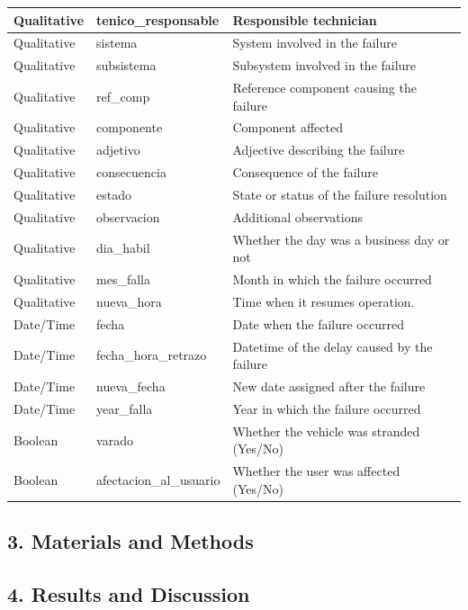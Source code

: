 \documentclass[
  letterpaper,
  DIV=11,
  numbers=noendperiod]{scrartcl}
\begin{document}
\begin{table}[H]
\begin{tabular}[t]{l|l|l}
\hline
Qualitative & tenico\_responsable & Responsible technician\\
\hline
Qualitative & sistema & System involved in the failure\\
\hline
Qualitative & subsistema & Subsystem involved in the failure\\
\hline
Qualitative & ref\_comp & Reference component causing the failure\\
\hline
Qualitative & componente & Component affected\\
\hline
Qualitative & adjetivo & Adjective describing the failure\\
\hline
Qualitative & consecuencia & Consequence of the failure\\
\hline
Qualitative & estado & State or status of the failure resolution\\
\hline
Qualitative & observacion & Additional observations\\
\hline
Qualitative & dia\_habil & Whether the day was a business day or not\\
\hline
Qualitative & mes\_falla & Month in which the failure occurred\\
\hline
Qualitative & nueva\_hora & Time when it resumes operation.\\
\hline
Date/Time & fecha & Date when the failure occurred\\
\hline
Date/Time & fecha\_hora\_retrazo & Datetime of the delay caused by the failure\\
\hline
Date/Time & nueva\_fecha & New date assigned after the failure\\
\hline
Date/Time & year\_falla & Year in which the failure occurred\\
\hline
Boolean & varado & Whether the vehicle was stranded (Yes/No)\\
\hline
Boolean & afectacion\_al\_usuario & Whether the user was affected (Yes/No)\\
\hline
\end{tabular}
\end{table}

\subsection{3. Materials and Methods}\label{materials-and-methods}

\subsection{4. Results and Discussion}\label{results-and-discussion}
\end{document}
